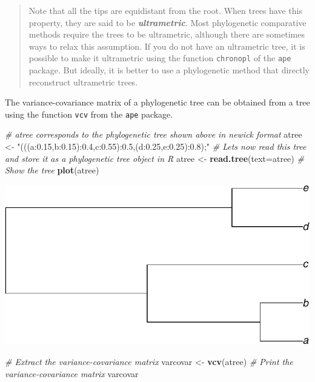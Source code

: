 \documentclass[
]{book}
\newenvironment{Shaded}{\begin{snugshade}}{\end{snugshade}}
\newcommand{\AttributeTok}[1]{\textcolor[rgb]{0.13,0.29,0.53}{#1}}
\newcommand{\CommentTok}[1]{\textcolor[rgb]{0.56,0.35,0.01}{\textit{#1}}}
\newcommand{\FunctionTok}[1]{\textcolor[rgb]{0.13,0.29,0.53}{\textbf{#1}}}
\newcommand{\NormalTok}[1]{#1}
\newcommand{\OtherTok}[1]{\textcolor[rgb]{0.56,0.35,0.01}{#1}}
\newcommand{\StringTok}[1]{\textcolor[rgb]{0.31,0.60,0.02}{#1}}
\begin{document}
\begin{quote}
Note that all the tips are equidistant from the root. When trees have this property, they are said to be \textbf{\emph{ultrametric}}. Most phylogenetic comparative methods require the trees to be ultrametric, although there are sometimes ways to relax this assumption. If you do not have an ultrametric tree, it is possible to make it ultrametric using the function \texttt{chronopl} of the \texttt{ape} package. But ideally, it is better to use a phylogenetic method that directly reconstruct ultrametric trees.
\end{quote}

The variance-covariance matrix of a phylogenetic tree can be obtained from a tree using the function \texttt{vcv} from the \texttt{ape} package.

\begin{Shaded}
\begin{Highlighting}[]
\CommentTok{\# \textquotesingle{}atree\textquotesingle{} corresponds to the phylogenetic tree shown above in newick format}
\NormalTok{atree }\OtherTok{\textless{}{-}} \StringTok{"(((a:0.15,b:0.15):0.4,c:0.55):0.5,(d:0.25,e:0.25):0.8);"}
\CommentTok{\# Let\textquotesingle{}s now read this tree and store it as a phylogenetic tree object in R}
\NormalTok{atree }\OtherTok{\textless{}{-}} \FunctionTok{read.tree}\NormalTok{(}\AttributeTok{text=}\NormalTok{atree)}
\CommentTok{\# Show the tree}
\FunctionTok{plot}\NormalTok{(atree)}
\end{Highlighting}
\end{Shaded}

\includegraphics{pcm-workshop_files/figure-latex/vcv function-1.pdf}

\begin{Shaded}
\begin{Highlighting}[]
\CommentTok{\# Extract the variance{-}covariance matrix}
\NormalTok{varcovar }\OtherTok{\textless{}{-}} \FunctionTok{vcv}\NormalTok{(atree)}
\CommentTok{\# Print the variance{-}covariance matrix}
\NormalTok{varcovar}
\end{Highlighting}
\end{Shaded}
\end{document}
